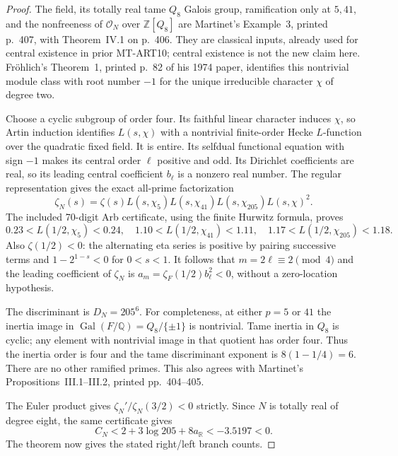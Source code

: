 \begin{proof}
The field, its totally real tame $Q_8$ Galois group, ramification
only at $5,41$, and the nonfreeness of $\mathcal O_N$ over
$\mathbb Z[Q_8]$ are Martinet's Example~3, printed p.~407, with
Theorem~IV.1 on p.~406. They are classical inputs, already used for
central existence in prior MT-ART10; central existence is not the
new claim here. Fr\"ohlich's Theorem~1, printed p.~82 of his 1974
paper, identifies this nontrivial module class with root number
$-1$ for the unique irreducible character $\chi$ of degree two.

Choose a cyclic subgroup of order four. Its faithful linear
character induces $\chi$, so Artin induction identifies $L(s,\chi)$
with a nontrivial finite-order Hecke $L$-function over the quadratic
fixed field. It is entire. Its selfdual functional equation with
sign $-1$ makes its central order $\ell$ positive and odd. Its
Dirichlet coefficients are real, so its leading central coefficient
$b_\ell$ is a nonzero real number. The regular representation gives
the exact all-prime factorization
\[
 \zeta_N(s)=\zeta(s)L(s,\chi_5)L(s,\chi_{41})L(s,\chi_{205})
                     L(s,\chi)^2.
\]
The included 70-digit Arb certificate, using the finite Hurwitz
formula, proves
\[
 0.23<L(1/2,\chi_5)<0.24,\quad
 1.10<L(1/2,\chi_{41})<1.11,\quad
 1.17<L(1/2,\chi_{205})<1.18.
\]
Also $\zeta(1/2)<0$: the alternating eta series is positive by
pairing successive terms and $1-2^{1-s}<0$ for $0<s<1$.
It follows that $m=2\ell\equiv2\pmod4$ and the leading coefficient
of $\zeta_N$ is
$a_m=\zeta_F(1/2)b_\ell^2<0$, without a zero-location hypothesis.

The discriminant is $D_N=205^6$. For completeness, at either
$p=5$ or $41$ the inertia image in
$\operatorname{Gal}(F/\mathbb Q)=Q_8/\{\pm1\}$ is nontrivial.
Tame inertia in $Q_8$ is cyclic; any element with nontrivial image
in that quotient has order four. Thus the inertia order is four
and the tame discriminant exponent is $8(1-1/4)=6$. There are no
other ramified primes. This also agrees with Martinet's
Propositions~III.1--III.2, printed pp.~404--405.

The Euler product gives $\zeta_N'/\zeta_N(3/2)<0$ strictly.
Since $N$ is totally real of degree eight, the same certificate gives
\[
 C_N<2+3\log205+8a_{\mathbb R}
       <-3.5197<0.
\]
The theorem now gives the stated right/left branch counts.
\end{proof}

